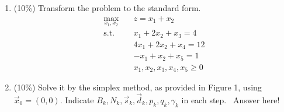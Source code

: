 \documentclass[a4paper,10pt]{article}
\begin{document}
\begin{enumerate}
\begin{enumerate}
        \item (10\%) Transform the problem to the standard form.
        {\color{blue} 
            \begin{equation}
                \begin{aligned}
                    \max_{x_1,x_2} \quad & z = x_1+x_2 \\
                    \textrm{s.t.} \quad & x_1 + 2x_2 + x_3 = 4 \\
                        \quad & 4x_1 + 2x_2 + x_4 =  12   \\
                        \quad & -x_1 + x_2 + x_5 = 1  \\
                        \quad & x_1, x_2, x_3, x_4, x_5 \geq 0
                \end{aligned}
            \end{equation}
        }

        \item (10\%) Solve it by the simplex method, as provided in Figure 1, using $\vec{x}_0 = (0, 0)$.
        Indicate $B_k, N_k, \vec{s}_k, \vec{d}_k, p_k, q_k, \gamma_k$ in each step.\
        {\color{blue} 
            Answer here!
        }
    \end{enumerate}


\end{enumerate}
\end{document}
